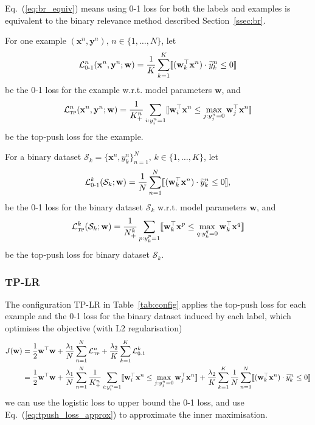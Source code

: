 \documentclass[9pt]{extarticle}
\newcommand{\llb}{\llbracket}
\newcommand{\rrb}{\rrbracket}
\newcommand{\x}{\mathbf{x}}
\newcommand{\y}{\mathbf{y}}
\newcommand{\1}{\mathbf{1}}
\newcommand{\w}{\mathbf{w}}
\newcommand{\LCal}{\mathcal{L}}
\newcommand{\SCal}{\mathcal{S}}
\begin{document}
Eq.~(\ref{eq:br_equiv}) means using 0-1 loss for both the labels and examples is equivalent to 
the binary relevance method described Section~\ref{ssec:br}.

For one example $(\x^n, \y^n), \, n \in \{1,\dots,N\}$, let
\begin{equation}
\label{eq:log_loss_example}
\LCal_\textsc{0-1}^n(\x^n, \y^n; \w) = \frac{1}{K} \sum_{k=1}^K \llb (\w_k^\top \x^n) \cdot \widetilde{y}_k^n \le 0 \rrb 
\end{equation}
be the 0-1 loss for the example w.r.t. model parameters $\w$, and
\begin{equation}
\label{eq:tp_loss_example}
\LCal_\textsc{tp}^n(\x^n, \y^n; \w) = \frac{1}{K_+^n} \sum_{i: y_i^n=1} \llb \w_i^\top \x^n \le \max_{j: y_j^n=0} \w_j^\top \x^n \rrb
\end{equation}
be the top-push loss for the example. 

For a binary dataset $\SCal_k = \{\x^n, y_k^n\}_{n=1}^N, \, k \in \{1,\dots,K\}$, let
\begin{equation}
\label{eq:log_loss_label}
\LCal_\textsc{0-1}^k(\SCal_k; \w) = \frac{1}{N} \sum_{n=1}^N \llb (\w_k^\top \x^n) \cdot \widetilde{y}_k^n \le 0 \rrb,
\end{equation}
be the 0-1 loss for the binary dataset $\SCal_k$ w.r.t. model parameters $\w$, and
\begin{equation}
\label{eq:tp_loss_label}
\LCal_\textsc{tp}^k(\SCal_k; \w) = \frac{1}{N_+^k} \sum_{p: y_k^p=1} \llb \w_k^\top \x^p \le \max_{q: y_k^q=0} \w_k^\top \x^q \rrb
\end{equation}
be the top-push loss for binary dataset $\SCal_k$.


\subsubsection{TP-LR}
\label{sssec:tp-lr}

The configuration TP-LR in Table~\ref{tab:config} applies the top-push loss for each example and 
the 0-1 loss for the binary dataset induced by each label, which optimises the objective (with L2 regularisation)
\begin{equation}
\label{eq:tp_lr_obj}
\begin{aligned}
J(\w)
&= \frac{1}{2} \w^\top \w +
   \frac{\lambda_1}{N} \sum_{n=1}^N \LCal_\textsc{tp}^n +
   \frac{\lambda_2}{K} \sum_{k=1}^K \LCal_\textsc{0-1}^k \\
&= \frac{1}{2} \w^\top \w +
   \frac{\lambda_1}{N} \sum_{n=1}^N \frac{1}{K_+^n} \sum_{i: y_i^n=1} \llb \w_i^\top \x^n \le \max_{j: y_j^n=0} \w_j^\top \x^n \rrb +
   \frac{\lambda_2}{K} \sum_{k=1}^K \frac{1}{N} \sum_{n=1}^N \llb (\w_k^\top \x^n) \cdot \widetilde{y}_k^n \le 0 \rrb %
\end{aligned}
\end{equation}
we can use the logistic loss to upper bound the 0-1 loss, and use Eq.~(\ref{eq:tpush_loss_approx}) to approximate the inner maximisation.
\end{document}
